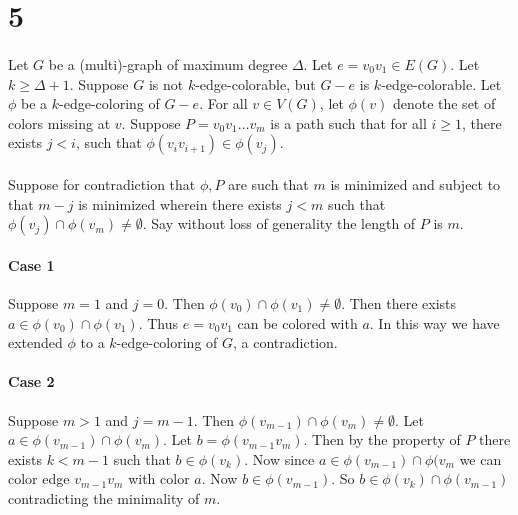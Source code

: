 \documentclass[letterpaper,12pt,oneside,onecolumn]{report}
\begin{document}
\section*{5}
\paragraph{}
Let $G$ be a (multi)-graph of maximum degree $\Delta$. Let $e = v_0v_1 \in E(G)$. Let $k \geq \Delta + 1$. Suppose $G$ is not $k$-edge-colorable, but $G-e$ is $k$-edge-colorable. Let $\phi$ be a $k$-edge-coloring of $G-e$. For all $v \in V(G)$, let $\phi(v)$ denote the set of colors missing at $v$. Suppose $P = v_0v_1\dots v_m$ is a path such that for all $i \geq 1$, there exists $j < i$, such that $\phi(v_iv_{i+1}) \in \phi(v_j)$.
\paragraph{}
Suppose for contradiction that $\phi, P$ are such that $m$ is minimized and subject to that $m-j$ is minimized wherein there exists $j < m$ such that $\phi(v_j) \cap \phi(v_m) \neq \emptyset$. Say without loss of generality the length of $P$ is $m$.
\paragraph{Case 1}
Suppose $m=1$ and $j=0$. Then $\phi(v_0) \cap \phi(v_1) \neq \emptyset$. Then there exists $a \in \phi(v_0) \cap \phi(v_1)$. Thus $e=v_0v_1$ can be colored with $a$. In this way we have extended $\phi$ to a $k$-edge-coloring of $G$, a contradiction.
\paragraph{Case 2}
Suppose $m > 1$ and $j=m-1$. Then $\phi(v_{m-1}) \cap \phi(v_m) \neq \emptyset$.  Let $a \in \phi(v_{m-1}) \cap \phi(v_m)$. Let $b = \phi(v_{m-1}v_m)$. Then by the property of $P$ there exists $k < m-1$ such that $b \in \phi(v_k)$. Now since $a \in \phi(v_{m-1}) \cap \phi(v_m$ we can color edge $v_{m-1}v_m$ with color $a$. Now $b \in \phi(v_{m-1})$. So $b \in \phi(v_k) \cap \phi(v_{m-1})$ contradicting the minimality of $m$.
\end{document}
